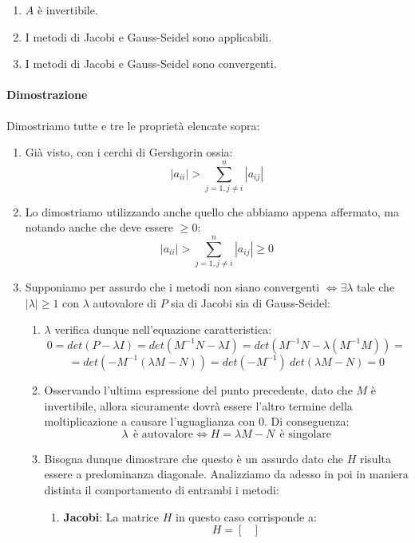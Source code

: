 \documentclass{article}
\begin{document}
\begin{enumerate}
    \item $A$ è invertibile.
    \item I metodi di Jacobi e Gauss-Seidel sono applicabili.
    \item I metodi di Jacobi e Gauss-Seidel sono convergenti.
\end{enumerate}

\paragraph{Dimostrazione} Dimostriamo tutte e tre le proprietà elencate sopra:

\begin{enumerate}
    \item Già visto, con i cerchi di Gershgorin ossia:
    \[ |a_{ii}| > \sum_{j=1, j \neq i}^{n} |a_{ij}| \]
    \item Lo dimostriamo utilizzando anche quello che abbiamo appena affermato, ma notando anche che deve essere $\geq 0$:
    \[ |a_{ii}| > \sum_{j=1, j \neq i}^{n} |a_{ij}| \geq 0 \]
    \item Supponiamo per assurdo che i metodi non siano convergenti $\Leftrightarrow \exists \lambda$ tale che $|\lambda| \geq 1$ con $\lambda$ autovalore di $P$ sia di Jacobi sia di Gauss-Seidel:
    \begin{enumerate}
        \item $\lambda$ verifica dunque nell'equazione caratteristica:
        \[ 0 = det(P - \lambda I) = det(M^{-1}N - \lambda I ) = det(M^{-1}N - \lambda (M^{-1}M) ) = \]
        \[ = det(-M^{-1}(\lambda M - N)) = det(-M^{-1}) \: det(\lambda M - N) = 0 \]
        \item Osservando l'ultima espressione del punto precedente, dato che $M$ è invertibile, allora sicuramente dovrà essere l'altro termine della moltiplicazione
        a causare l'uguaglianza con $0$. Di conseguenza:
        \[ \lambda \:\: \text{è autovalore} \Longleftrightarrow H = \lambda M - N \:\: \text{è singolare} \]
\newpage
        \item Bisogna dunque dimostrare che questo è un assurdo dato che $H$ risulta essere a predominanza diagonale. Analizziamo da adesso in poi
        in maniera distinta il comportamento di entrambi i metodi:
        \begin{enumerate}
            \item \textbf{Jacobi}: La matrice $H$ in questo caso corrisponde a:
            \[ H = \begin{bmatrix}

\end{bmatrix}\]
\end{enumerate}
\end{enumerate}
\end{enumerate}
\end{document}
